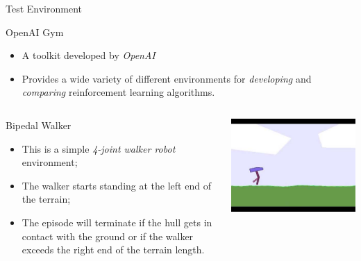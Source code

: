 \documentclass[presentation]{beamer}\mode<presentation>{\usetheme{AMSBolognaFC}}
\begin{document}
\begin{frame}{Test Environment}

\begin{block}{OpenAI Gym}
	\begin{itemize}
		\item A toolkit developed by \emph{OpenAI}
		\item Provides a wide variety of different environments for \emph{developing} and \emph{comparing} 
			reinforcement learning algorithms.
	\end{itemize}
\end{block}

\begin{columns}
	\begin{column}{0.55\textwidth}
		\begin{alertblock}{Bipedal Walker}
			\begin{itemize}
				\item This is a simple \emph{4-joint walker robot} environment;
				\item The walker starts standing at the left end of the terrain;
				\item The episode will terminate if the hull gets in contact with the 
					ground or if the walker exceeds the right end of the terrain length.
			\end{itemize}
		\end{alertblock}
	\end{column}
	\begin{column}{0.45\textwidth}
	\includegraphics[width=\textwidth]{img/bipedal.jpeg}
	\end{column}
\end{columns}

\end{frame}
\end{document}
